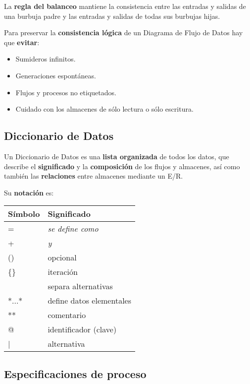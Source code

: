 La \textbf{regla del balanceo} mantiene la consistencia entre las entradas y salidas de una burbuja padre y las entradas y salidas de todas sus burbujas hijas.

Para preservar la \textbf{consistencia lógica} de un Diagrama de Flujo de Datos hay que \textbf{evitar}:

\begin{itemize}[noitemsep]
\item Sumideros infinitos.
\item Generaciones espontáneas.
\item Flujos y procesos no etiquetados.
\item Cuidado con los almacenes de sólo lectura o sólo escritura.
\end{itemize}


\subsection{Diccionario de Datos} %
Un Diccionario de Datos es una \textbf{lista organizada} de todos los datos, que describe el \textbf{significado} y la \textbf{composición} de los flujos y almacenes, así como también las \textbf{relaciones} entre almacenes mediante un E/R.

Su \textbf{notación} es:

\begin{center}
  \begin{tabular}[h]{ l | l }
    \textbf{Símbolo}   & \textbf{Significado} \\
    \hline
    =                  & \textit{se define como} \\
    +                  & \textit{y} \\
    ()                 & opcional \\
    \{\}               & iteración \\
    \big[\big]         & separa alternativas \\
    *...*              & define datos elementales \\
    **                 & comentario \\
    @                  & identificador (clave) \\
    |                  & alternativa \\
  \end{tabular}
\end{center}

\subsection{Especificaciones de proceso}

